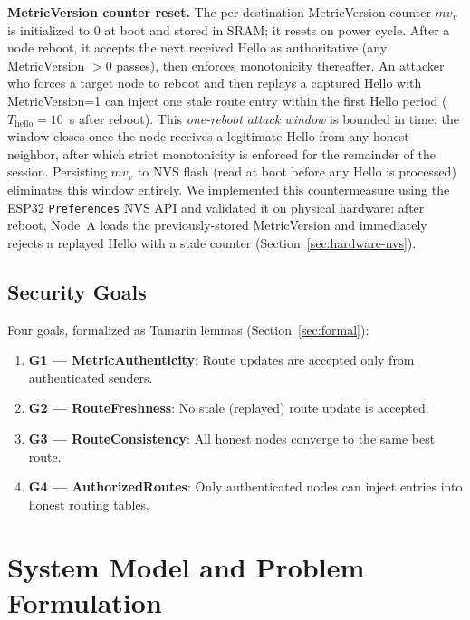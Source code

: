 \documentclass[10pt,journal,compsoc]{IEEEtran}
\begin{document}
\textbf{MetricVersion counter reset.}
The per-destination MetricVersion counter $mv_v$ is initialized
to 0 at boot and stored in SRAM; it resets on power cycle.
After a node reboot, it accepts the next received Hello as
authoritative (any MetricVersion $> 0$ passes), then enforces
monotonicity thereafter. An attacker who forces a target node
to reboot and then replays a captured Hello with MetricVersion=1
can inject one stale route entry within the first Hello period
($T_{\text{hello}} = 10$~s after reboot). This \emph{one-reboot
attack window} is bounded in time: the window closes once the
node receives a legitimate Hello from any honest neighbor, after
which strict monotonicity is enforced for the remainder of the
session. Persisting $mv_v$ to NVS flash (read at boot before
any Hello is processed) eliminates this window entirely.
We implemented this countermeasure using the ESP32 \texttt{Preferences}
NVS API and validated it on physical hardware: after reboot,
Node~A loads the previously-stored MetricVersion and immediately
rejects a replayed Hello with a stale counter
(Section~\ref{sec:hardware-nvs}).

\subsection{Security Goals}

Four goals, formalized as Tamarin lemmas (Section~\ref{sec:formal}):

\begin{enumerate}
  \item \textbf{G1 — MetricAuthenticity}: Route updates are accepted
    only from authenticated senders.
  \item \textbf{G2 — RouteFreshness}: No stale (replayed) route
    update is accepted.
  \item \textbf{G3 — RouteConsistency}: All honest nodes converge
    to the same best route.
  \item \textbf{G4 — AuthorizedRoutes}: Only authenticated nodes
    can inject entries into honest routing tables.
\end{enumerate}

\section{System Model and Problem Formulation}
\label{sec:model}
\end{document}
